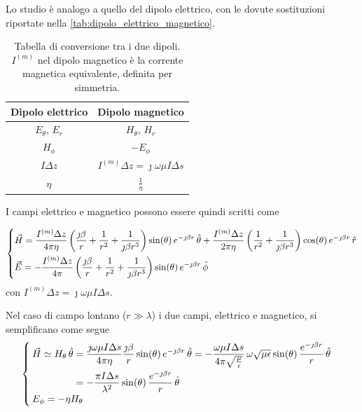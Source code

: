 Lo studio è analogo a quello del dipolo elettrico, con le dovute sostituzioni riportate nella \autoref{tab:dipolo_elettrico_magnetico}.

\begin{table}[h]
	\centering
	\begin{tabular}{cc}
		\toprule
		Dipolo elettrico & Dipolo magnetico \\
		\midrule
		$E_{\theta}$, $E_{r}$ & $H_{\theta}$, $H_{r}$ \\
		$H_{\phi}$ & $-E_{\phi}$ \\
		$I \Delta z$ & $I^{(m)} \Delta z =  \jmath \omega \mu I \Delta s$ \\
		$\eta$ & $\frac{1}{\eta}$ \\
		\bottomrule
	\end{tabular}
	\caption{Tabella di conversione tra i due dipoli. $I^{(m)}$ nel dipolo magnetico è la corrente magnetica equivalente, definita per simmetria.}
	\label{tab:dipolo_elettrico_magnetico}
\end{table}

I campi elettrico e magnetico possono essere quindi scritti come

\begin{equation}
	\begin{dcases}
		\vec{H}
		= \frac{I^{(m)} \Delta z}{4 \pi \eta}
		\left(
			\frac{\jmath \beta}{r} + \frac{1}{r^2}
			+ \frac{1}{\jmath \beta r^3}
		\right)
		\sin (\theta) \, e^{-\jmath \beta r} \,\hat{\theta}
		+ \frac{I^{(m)} \Delta z}{2 \pi \eta}
		\left(
			\frac{1}{r^2} + \frac{1}{\jmath \beta r^3}
		\right)
		\cos (\theta) \, e^{-\jmath \beta r} \,\hat{r} \\
		\vec{E}
		= - \frac{I^{(m)} \Delta z}{4 \pi}
		\left(
			\frac{\jmath \beta}{r}
			+ \frac{1}{r^2}
			+ \frac{1}{\jmath \beta r^3}
		\right)
		\sin (\theta) \, e^{-\jmath \beta r} \,\hat{\phi}
	\end{dcases}
\end{equation}
con $I^{(m)} \Delta z = \jmath \omega \mu I \Delta s$.

Nel caso di campo lontano ($r \gg \lambda$) i due campi, elettrico e magnetico, si semplificano come segue
\begin{equation}
	\begin{cases}
		\begin{split}
			\vec{H}
			\simeq H_{\theta} \,\hat{\theta}
			& = \frac{\jmath \omega \mu I \Delta s}{4 \pi \eta} \frac{\jmath \beta}{r} \sin (\theta) \, e^{-\jmath \beta r} \,\hat{\theta}
			= -\frac{\omega \mu I \Delta s}{4 \pi \sqrt{\frac{\mu}{\epsilon}}}
			\, \omega \sqrt{\mu \epsilon} \sin (\theta)
			\, \frac{e^{-\jmath \beta r}}{r} \,\hat{\theta} \\
			& = -\frac{\pi I \Delta s}{\lambda^2} \sin (\theta)\, \frac{e^{-\jmath \beta r}}{r} \,\hat{\theta}
		\end{split} \\
		E_{\phi} = - \eta H_{\theta}
	\end{cases}
\end{equation}

